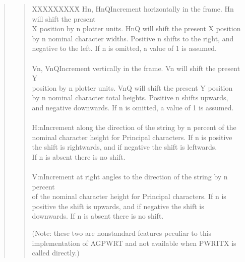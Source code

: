 \begin{quote}
\begin{quote}
\begin{tabbing}
XXXXXXXXX\=\kill
Hn, HnQ\>Increment horizontally in the frame.  Hn will shift the present\\
\>X position by n plotter units. HnQ will shift the present X position\\
\>by n nominal character widths.  Positive n shifts to the right, and\\
\>negative to the left.  If n is omitted, a value of 1 is assumed.\\
\\
Vn, VnQ\>Increment vertically in the frame.  Vn will shift the present Y\\
\>position by n plotter units.  VnQ will shift the present Y position\\
\>by n nominal character total heights.  Positive n shifts upwards,\\
\>and negative downwards.  If n is omitted, a value of 1 is assumed.\\
\\
H:n\>Increment along the direction of the string by n percent of the\\
\>nominal character height for Principal characters.  If n is positive\\
\>the shift is rightwards, and if negative the shift is leftwards.\\
\>If n is absent there is no shift.\\
\\
V:n\>Increment at right angles to the direction of the string by n percent\\
\>of the nominal character height for Principal characters.  If n is\\
\>positive the shift is upwards, and if negative the shift is\\
\>downwards.  If n is absent there is no shift.
\end{tabbing}

(Note: these two are nonstandard features peculiar to this
implementation of AGPWRT and not available when PWRITX is
called directly.)


\end{quote}
\end{quote}
